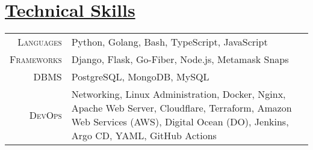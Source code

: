 \documentclass[a4paper,10pt]{extarticle} %
\begin{document}
 \vspace{+0.4cm} \section{\textcolor{primary}{\href{https://www.github.com/proffapt/bodhitree}{Technical Skills}}}

 \vspace{+0.2cm}

 \begin{tabular}{r|p{15cm}}
 \textsc{Languages} & Python, Golang, Bash, TypeScript, JavaScript \\
 \textsc{Frameworks} & Django, Flask, Go-Fiber, Node.js, Metamask Snaps  \\
 \textsc{DBMS} & PostgreSQL, MongoDB, MySQL \\
 \textsc{DevOps} & Networking, Linux Administration, Docker, Nginx, Apache Web Server, Cloudflare, Terraform, Amazon Web Services (AWS), Digital Ocean (DO), Jenkins, Argo CD, YAML, GitHub Actions \\
 
\end{tabular}
\end{document}
